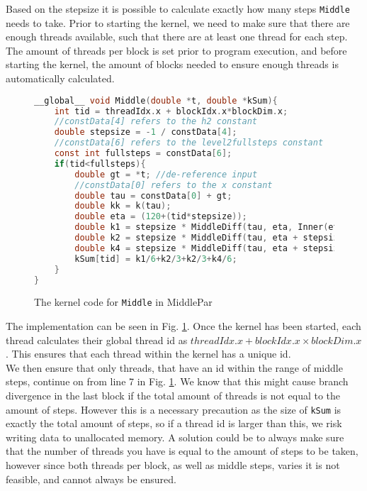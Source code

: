 Based on the stepsize it is possible to calculate exactly how many steps \texttt{Middle} needs to take. Prior to starting the kernel, we need to make sure that there are enough threads available, such that there are at least one thread for each step. The amount of threads per block is set prior to program execution, and before starting the kernel, the amount of blocks needed to ensure enough threads is automatically calculated.

\begin{figure}[ht!]
\begin{lstlisting}[language=c]
__global__ void Middle(double *t, double *kSum){
	int tid = threadIdx.x + blockIdx.x*blockDim.x;
	//constData[4] refers to the h2 constant
	double stepsize = -1 / constData[4]; 
	//constData[6] refers to the level2fullsteps constant
	const int fullsteps = constData[6]; 
	if(tid<fullsteps){
		double gt = *t; //de-reference input
		//constData[0] refers to the x constant
		double tau = constData[0] + gt; 
		double kk = k(tau);
		double eta = (120+(tid*stepsize));
		double k1 = stepsize * MiddleDiff(tau, eta, Inner(eta, gt, kk).y);
		double k2 = stepsize * MiddleDiff(tau, eta + stepsize/2, Inner(eta + stepsize/2, gt, kk).y);		
		double k4 = stepsize * MiddleDiff(tau, eta + stepsize, Inner(eta + stepsize, gt, kk).y);
		kSum[tid] = k1/6+k2/3+k2/3+k4/6;
	}
}
\end{lstlisting}
\caption{The kernel code for \texttt{Middle} in MiddlePar}
\label{fig:middlepar}
\end{figure}

The implementation can be seen in Fig. \ref{fig:middlepar}. Once the kernel has been started, each thread calculates their global thread id as $threadIdx.x + blockIdx.x \times blockDim.x$. This ensures that each thread within the kernel has a unique id.\\

We then ensure that only threads, that have an id within the range of middle steps, continue on from line 7 in Fig. \ref{fig:middlepar}. We know that this might cause branch divergence in the last block if the total amount of threads is not equal to the amount of steps. However this is a necessary precaution as the size of \texttt{kSum} is exactly the total amount of steps, so if a thread id is larger than this, we risk writing data to unallocated memory. A solution could be to always make sure that the number of threads you have is equal to the amount of steps to be taken, however since both threads per block, as well as middle steps, varies it is not feasible, and cannot always be ensured.\\

